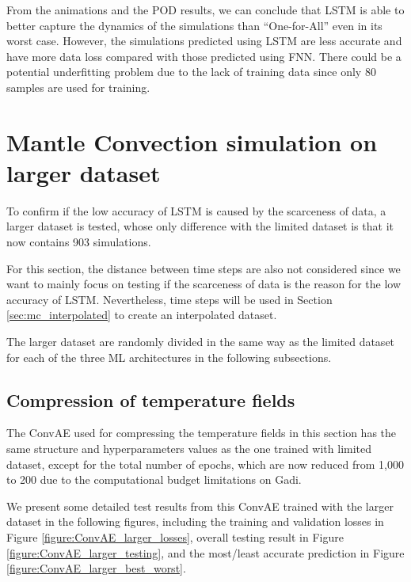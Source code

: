 From the animations and the POD results, we can conclude that LSTM is able to better capture the dynamics of the simulations than ``One-for-All'' even in its worst case. However, the simulations predicted using LSTM are less accurate and have more data loss compared with those predicted using FNN. There could be a potential underfitting problem due to the lack of training data since only 80 samples are used for training.


\section{Mantle Convection simulation on larger dataset}

To confirm if the low accuracy of LSTM is caused by the scarceness of data, a larger dataset is tested, whose only difference with the limited dataset is that it now contains 903 simulations.

For this section, the distance between time steps are also not considered since we want to mainly focus on testing if the scarceness of data is the reason for the low accuracy of LSTM. Nevertheless, time steps will be used in Section \ref{sec:mc_interpolated} to create an interpolated dataset.

The larger dataset are randomly divided in the same way as the limited dataset for each of the three ML architectures in the following subsections.

\subsection{Compression of temperature fields}

The ConvAE used for compressing the temperature fields in this section has the same structure and hyperparameters values as the one trained with limited dataset, except for the total number of epochs, which are now reduced from 1,000 to 200 due to the computational budget limitations on Gadi.

We present some detailed test results from this ConvAE trained with the larger dataset in the following figures, including the training and validation losses in Figure \ref{figure:ConvAE_larger_losses}, overall testing result in Figure \ref{figure:ConvAE_larger_testing}, and the most/least accurate prediction in Figure \ref{figure:ConvAE_larger_best_worst}.

